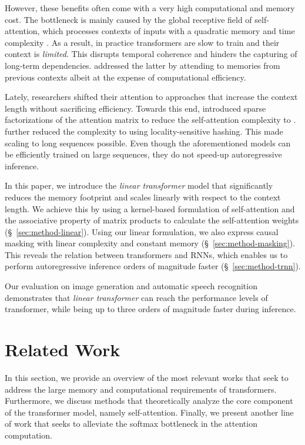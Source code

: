 \documentclass{article}
\newcommand{\linear}{\emph{linear transformer}}
\begin{document}
However, these benefits often come with a very high computational and memory
cost. The bottleneck is mainly caused by the global receptive field of self-attention, which processes
contexts of  inputs with a quadratic memory and time complexity
. As a result, in practice transformers are slow to train and their
context is \textit{limited}. This disrupts temporal coherence and hinders the
capturing of long-term dependencies. \citet{dai-etal-2019-transformer}
addressed the latter by attending to memories from previous contexts albeit at
the expense of computational efficiency.

Lately, researchers shifted their attention to approaches that increase the
context length without sacrificing efficiency. Towards this end,
\citet{child2019generating} introduced sparse factorizations of the attention
matrix to reduce the self-attention complexity to .
\citet{kitaev2020reformer} further reduced the complexity to 
using locality-sensitive hashing. This made scaling to long sequences
possible. Even though the aforementioned models can be efficiently trained on
large sequences, they do not speed-up autoregressive inference.

In this paper, we introduce the \linear{} model that
significantly reduces the memory footprint and scales linearly with respect to
the context length. We achieve this by using a kernel-based formulation of
self-attention and the associative property of matrix products to calculate the
self-attention weights (\S~\ref{sec:method-linear}). Using our linear
formulation, we also express causal masking with linear complexity and constant
memory (\S~\ref{sec:method-masking}). This reveals the relation between
transformers and RNNs, which enables us to perform autoregressive inference
orders of magnitude faster (\S~\ref{sec:method-trnn}).

Our evaluation on image generation and automatic speech recognition
demonstrates that \linear{} can reach the performance levels
of transformer, while being up to three orders of magnitude faster during
inference.

\section{Related Work}

In this section, we provide an overview of the most relevant works that seek to
address the large memory and computational requirements of transformers.
Furthermore, we discuss methods that theoretically analyze the core
component of the transformer model, namely self-attention. Finally, we present
another line of work that seeks to alleviate the softmax bottleneck in the
attention computation.
\end{document}
